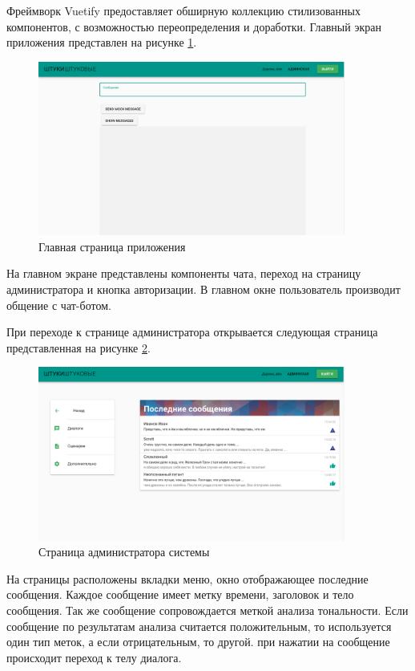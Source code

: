 Фреймворк Vuetify предоставляет обширную коллекцию стилизованных компонентов, с возможностью переопределения и доработки. Главный экран приложения представлен на рисунке \ref{fig:main_page}. 
\begin{figure}[H]
    \centering
    \includegraphics[width=0.9\textwidth]{image/main_page.png}
    \caption{Главная страница приложения}
    \label{fig:main_page}
\end{figure}

На главном экране представлены компоненты чата, переход на страницу администратора и кнопка авторизации. В главном окне пользователь производит общение с чат-ботом. 

При переходе к странице администратора открывается следующая страница представленная на рисунке \ref{fig:admin_page}. 

\begin{figure}
    \centering
    \includegraphics[width=0.9\textwidth]{image/admin_page.png}
    \caption{Страница администратора системы}
    \label{fig:admin_page}
\end{figure}

На страницы расположены вкладки меню, окно отображающее последние сообщения. Каждое сообщение имеет метку времени, заголовок и тело сообщения. Так же сообщение сопровождается меткой анализа тональности. Если сообщение по результатам анализа считается положительным, то используется один тип меток, а если отрицательным, то другой. при нажатии на сообщение происходит переход к телу диалога. 

